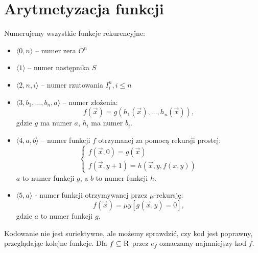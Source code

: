 \section{Arytmetyzacja funkcji}
Numerujemy wszystkie funkcje rekurencyjne:
\begin{itemize}
\singlespacing
    \item \(\langle 0,n \rangle\) -- numer zera \(O^n\)
    \item \(\langle 1 \rangle\) -- numer następnika \(S\)
    \item \(\langle 2,n,i \rangle\) -- numer rzutowania \(I_i^n, i \leq n\)
    \item \(\langle 3,b_1,\dots,b_n,a \rangle\) -- numer złożenia:
    \[ f(\vec{x}) = g(h_1(\vec{x}), \dots, h_n(\vec{x})), \]
 gdzie \(g\) ma numer \(a\), \(h_i\) ma numer \(b_i\). 
 \item \(\langle 4,a,b \rangle\) -- numer funkcji \(f\) otrzymanej za pomocą rekursji prostej:
 \[
 \begin{cases}
     f(\vec{x},0) = g(\vec{x}) \\
     f(\vec{x},y+1) = h(\vec{x},y,f(x,y))
 \end{cases}
 \]
 \(a\) to numer funkcji \(g\), a \(b\) to numer funkcji \(h\).
 \item \(\langle 5,a \rangle\) - numer funkcji otrzymywanej przez \(\mu\)-rekursję:
 \[ f(\vec{x}) = \mu y[g(\vec{x},y)=0], \]
 gdzie \(a\) to numer funkcji \(g\).
\end{itemize}
Kodowanie nie jest suriektywne, ale możemy sprawdzić, czy kod jest poprawny, przeglądając kolejne funkcje. Dla \(f \subseteq \textsc{R}\) \: przez \(e_f\) oznaczamy najmniejszy kod \(f\).
